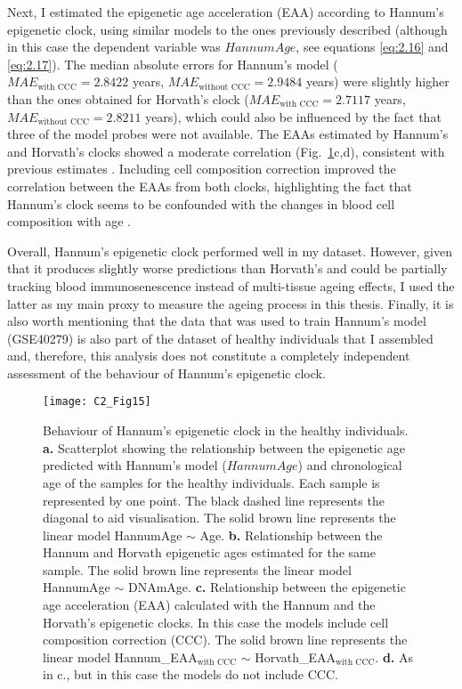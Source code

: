 \bigskip

Next, I estimated the epigenetic age acceleration (EAA) according to Hannum's epigenetic clock, using similar models to the ones previously described (although in this case the dependent variable was $HannumAge$, see equations \ref{eq:2.16} and \ref{eq:2.17}). The median absolute errors for Hannum's model ($MAE_{\text{with CCC}} = 2.8422$ years, $MAE_{\text{without CCC}} = 2.9484$ years) were slightly higher than the ones obtained for Horvath's clock ($MAE_{\text{with CCC}} = 2.7117$ years, $MAE_{\text{without CCC}} = 2.8211$ years), which could also be influenced by the fact that three of the model probes were not available. The EAAs estimated by Hannum's and Horvath's clocks showed a moderate correlation (Fig.~\ref{fig:c2_fig15}c,d), consistent with previous estimates \citep{Irvin2018}. Including cell composition correction improved the correlation between the EAAs from both clocks, highlighting the fact that Hannum's clock seems to be confounded with the changes in blood cell composition with age \citep{Marioni2015,Irvin2018}. 

\bigskip

Overall, Hannum's epigenetic clock performed well in my dataset. However, given that it produces slightly worse predictions than Horvath's and could be partially tracking blood immunosenescence instead of multi-tissue ageing effects, I used the latter as my main proxy to measure the ageing process in this thesis. Finally, it is also worth mentioning that the data that was used to train Hannum's model (GSE40279) is also part of the dataset of healthy individuals that I assembled and, therefore, this analysis does not constitute a completely independent assessment of the behaviour of Hannum's epigenetic clock.


\begin{figure}[htbp!] 
	\centering
	\texttt{[image: C2\_Fig15]}
	\vspace*{2mm}    
	\caption[Behaviour of Hannum's epigenetic clock in the healthy individuals]{Behaviour of Hannum's epigenetic clock in the healthy individuals. \textbf{a.} Scatterplot showing the relationship between the epigenetic age predicted with Hannum's model ($HannumAge$) \citep{Hannum2013} and chronological age of the samples for the healthy individuals. Each sample is represented by one point. The black dashed line represents the diagonal to aid visualisation. The solid brown line represents the linear model HannumAge $\sim$ Age. \textbf{b.} Relationship between the Hannum and Horvath epigenetic ages estimated for the same sample. The solid brown line represents the linear model HannumAge $\sim$ DNAmAge. \textbf{c.} Relationship between the epigenetic age acceleration (EAA) calculated with the Hannum and the Horvath's epigenetic clocks. In this case the models include cell composition correction (CCC). The solid brown line represents the linear model Hannum\_EAA$_{\text{with CCC}}$ $\sim$ Horvath\_EAA$_{\text{with CCC}}$. \textbf{d.} As in c., but in this case the models do not include CCC.}
	\label{fig:c2_fig15}
\end{figure}



